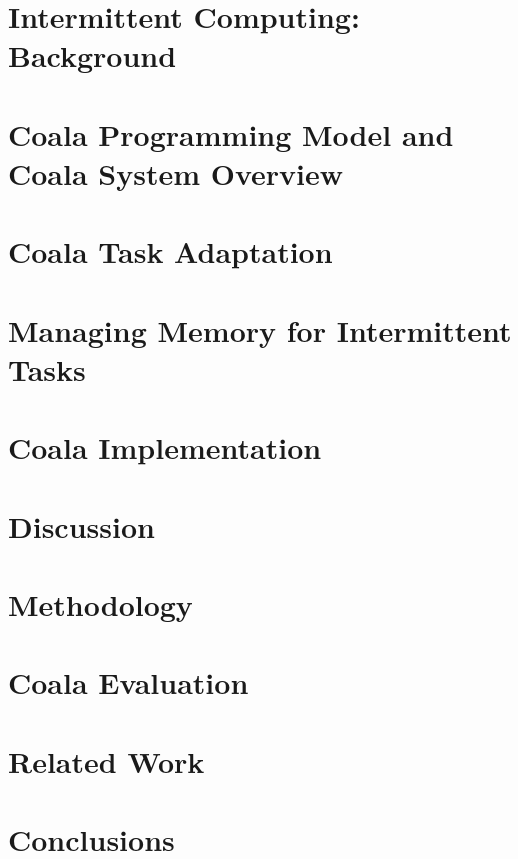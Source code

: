 \documentclass[acmsmall,review,anonymous]{acmart}\settopmatter{printfolios=true,printccs=false,printacmref=false}
\newcommand{\sys}{Coala\xspace}
\begin{document}


\section{Intermittent Computing: Background}
\label{sec:background}




\section{\sys Programming Model and \sys System Overview}
\label{sec:systemdescription}



\section{\sys Task Adaptation}
\label{sec:task_adaptation}

%




\section{Managing Memory for Intermittent Tasks}
\label{sec:memory_virtulaization}



\section{\sys Implementation}
\label{sec:implementation}



\section{Discussion}
\label{sec:discussion}



\section{Methodology}
\label{sec:methodology}



\section{\sys Evaluation}
\label{sec:evaluation}



\section{Related Work}
\label{sec:related_work}



\section{Conclusions}
\label{sec:conclusions}




\end{document}
